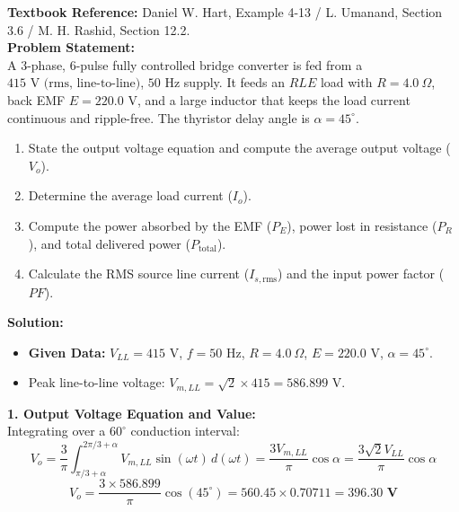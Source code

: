 \documentclass[10pt,a4paper]{article}
\begin{document}
\begin{tcolorbox}[qbox, title={Question 7: Three-Phase Fully Controlled Converter with RLE Load}]
\textbf{Textbook Reference:} Daniel W. Hart, Example 4-13 / L. Umanand, Section 3.6 / M. H. Rashid, Section 12.2.\\[1mm]
\textbf{Problem Statement:}\\
A 3-phase, 6-pulse fully controlled bridge converter is fed from a $415\text{ V (rms, line-to-line)}$, $50\text{ Hz}$ supply. It feeds an $RLE$ load with $R = 4.0\ \Omega$, back EMF $E = 220.0\text{ V}$, and a large inductor that keeps the load current continuous and ripple-free. The thyristor delay angle is $\alpha = 45^\circ$.
\begin{enumerate}
  \item State the output voltage equation and compute the average output voltage ($V_o$).
  \item Determine the average load current ($I_o$).
  \item Compute the power absorbed by the EMF ($P_E$), power lost in resistance ($P_R$), and total delivered power ($P_{\text{total}}$).
  \item Calculate the RMS source line current ($I_{s,\text{rms}}$) and the input power factor ($PF$).
\end{enumerate}
\end{tcolorbox}

\vspace{1mm}
\noindent\textbf{\textcolor{accentteal}{Solution:}}
\begin{itemize}
  \item \textbf{Given Data:} $V_{LL} = 415\text{ V}$, $f = 50\text{ Hz}$, $R = 4.0\ \Omega$, $E = 220.0\text{ V}$, $\alpha = 45^\circ$.
  \item Peak line-to-line voltage: $V_{m,LL} = \sqrt{2} \times 415 = 586.899\text{ V}$.
\end{itemize}

\noindent\textbf{1. Output Voltage Equation and Value:}\\
Integrating over a $60^\circ$ conduction interval:
\[
V_o = \frac{3}{\pi} \int_{\pi/3 + \alpha}^{2\pi/3 + \alpha} V_{m,LL} \sin(\omega t)\, d(\omega t) = \frac{3 V_{m,LL}}{\pi} \cos\alpha = \frac{3\sqrt{2} V_{LL}}{\pi} \cos\alpha
\]
\[
V_o = \frac{3 \times 586.899}{\pi} \cos(45^\circ) = 560.45 \times 0.70711 = \mathbf{396.30\text{ V}}
\]
\end{document}
